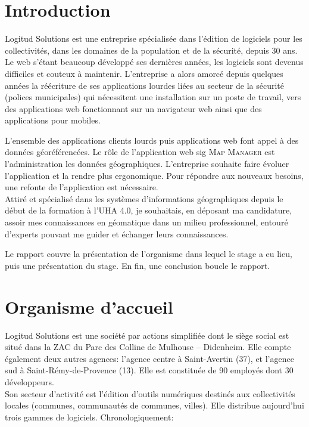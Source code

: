 \documentclass{rapportUHA40}
\begin{document}

\renewcommand{\baselinestretch}{0.9}\normalsize
\tabledematieres%
\renewcommand{\baselinestretch}{1.0}\normalsize

\setcounter{figure}{0}%


\section{Introduction}
Logitud Solutions est une entreprise spécialisée dans l'édition de logiciels
pour les collectivités, dans les domaines de la population et de la sécurité,
depuis 30 ans. Le web s'étant beaucoup développé ses dernières années, les
logiciels sont devenus difficiles et couteux à maintenir. L'entreprise a alors
amorcé depuis quelques années la réécriture de ses applications lourdes liées
au secteur de la sécurité (polices municipales) qui nécessitent une
installation sur un poste de travail, vers des applications web fonctionnant
sur un navigateur web ainsi que des applications pour mobiles.

L'ensemble des applications clients lourds puis applications web font appel à
des données géoréférencées. Le rôle de l'application web \gls{sig} \textsc{Map
  Manager} est l'administration les données géographiques. L'entreprise souhaite
faire évoluer l'application et la rendre plus ergonomique. Pour répondre aux
nouveaux besoins, une refonte de l'application est nécessaire. \\

Attiré et spécialisé dans les systèmes d'informations géographiques depuis le
début de la formation à l'UHA 4.0, je souhaitais, en déposant ma candidature,
assoir mes connaissances en géomatique dans un milieu professionnel, entouré
d'experts pouvant me guider et échanger leurs connaissances.

\vspace{2cm}

Le rapport couvre la présentation de l'organisme dans lequel le stage a eu
lieu, puis une présentation du stage. En fin, une conclusion boucle le rapport.

\newpage

\section{Organisme d'accueil}
Logitud Solutions est une société par actions simplifiée dont le siège social
est situé dans la ZAC du Parc des Colline de Mulhouse – Didenheim. Elle compte
également deux autres agences: l'agence centre à Saint-Avertin (37), et
l’agence sud à Saint-Rémy-de-Provence (13). Elle est constituée de 90 employés
dont 30 développeurs. \\ Son secteur d'activité est l'édition d'outils
numériques destinés aux collectivités locales (communes, communautés de
communes, villes). Elle distribue aujourd'hui trois gammes de logiciels.
Chronologiquement:
\end{document}
